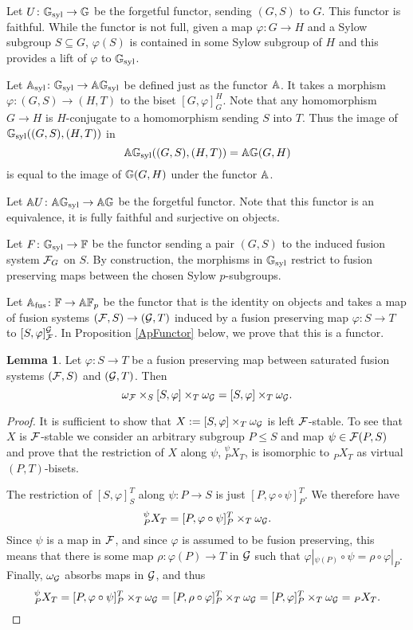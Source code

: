 \documentclass[10pt]{amsart}
\theoremstyle{definition}
\newtheorem{lemma}[theorem]{Lemma}
\renewcommand{\phi}{\varphi}
\begin{document}
Let $U \colon \mathbb{G}_{\text{syl}} \rightarrow \mathbb{G}$ be the forgetful functor, sending $(G,S)$ to $G$. This functor is faithful. While the functor is not full, given a map $\phi \colon G \rightarrow H$ and a Sylow subgroup $S \subseteq G$, $\phi(S)$ is contained in some Sylow subgroup of $H$ and this provides a lift of $\phi$ to $\mathbb{G}_{\text{syl}}$.

Let $\mathbb{A}_{\text{syl}} \colon \mathbb{G}_{\text{syl}} \rightarrow \mathbb{A} \mathbb{G}_{\text{syl}}$ be defined just as the functor $\mathbb{A}$. It takes a morphism $\phi \colon (G,S) \rightarrow (H,T)$ to the biset $[G, \phi]_{G}^{H}$. Note that any homomorphism $G \rightarrow H$ is $H$-conjugate to a homomorphism sending $S$ into $T$. Thus the image of $\mathbb{G}_{\text{syl}}((G,S), (H,T))$ in
\[
\mathbb{A} \mathbb{G}_{\text{syl}}((G,S),(H,T)) = \mathbb{A} \mathbb{G}(G,H)
\]
is equal to the image of $\mathbb{G}(G,H)$ under the functor $\mathbb{A}$.

Let $\mathbb{A} U \colon \mathbb{A} \mathbb{G}_{\text{syl}} \rightarrow \mathbb{A} \mathbb{G}$ be the forgetful functor. Note that this functor is an equivalence, it is fully faithful and surjective on objects.

Let $F \colon \mathbb{G}_{\text{syl}} \rightarrow \mathbb{F}$ be the functor sending a pair $(G,S)$ to the induced fusion system $\mathcal{F}_G$ on $S$. By construction, the morphisms in $\mathbb{G}_{\text{syl}}$ restrict to fusion preserving maps between the chosen Sylow $p$-subgroups.

Let $\mathbb{A}_{\text{fus}} \colon \mathbb{F} \rightarrow \mathbb{A} \mathbb{F}_p$ be the functor that is the identity on objects and takes a map of fusion systems $(\mathcal{F},S) \rightarrow (\mathcal{G},T)$ induced by a fusion preserving map $\phi \colon S \rightarrow T$ to $[S, \phi]_{\cF}^{\cG}$. In Proposition \ref{ApFunctor} below, we prove that this is a functor.

\begin{lemma}\label{fusionPreservingMaps}
Let $\phi\colon S\to T$ be a fusion preserving map between saturated fusion systems $(\mathcal{F},S)$ and $(\mathcal{G}, T)$. Then
\[\omega_\cF\times_S [S,\phi] \times_T \omega_\cG = [S,\phi]\times_T \omega_\cG.\]
\end{lemma}

\begin{proof}
It is sufficient to show that $X:= [S,\phi]\times_T \omega_\cG$ is left $\mathcal{F}$-stable. To see that $X$ is $\mathcal{F}$-stable we consider an arbitrary subgroup $P\leq S$ and map $\psi\in \mathcal{F}(P,S)$ and prove that the restriction of $X$ along $\psi$, ${}_P^\psi X_T$, is isomorphic to ${}_P X_T$ as virtual $(P,T)$-bisets.

The restriction of $[S,\phi]_S^T$ along $\psi\colon P\to S$ is just $[P,\phi\circ \psi]_P^T$. We therefore have
\[{}_P^\psi X_T = [P,\phi\circ \psi]_P^T \times_T \omega_\cG.\]
Since $\psi$ is a map in $\mathcal{F}$, and since $\phi$ is assumed to be fusion preserving, this means that there is some map $\rho\colon \phi(P) \to T$ in $\mathcal{G}$ such that $\phi|_{\psi(P)}\circ \psi = \rho\circ \phi|_P$. Finally, $\omega_{\mathcal{G}}$ absorbs maps in $\mathcal{G}$, and thus
\[{}_P^\psi X_T = [P,\phi\circ \psi]_P^T \times_T \omega_\cG = [P,\rho\circ \phi]_P^T \times_T \omega_\cG =  [P,\phi]_P^T \times_T \omega_\cG = {}_P X_T.\qedhere\]
\end{proof}
\end{document}
